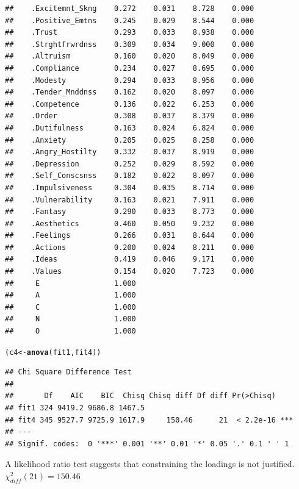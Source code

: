 \documentclass{article}\usepackage[]{graphicx}\usepackage[]{color}
\makeatletter
\newcommand{\hlstd}[1]{\textcolor[rgb]{0.345,0.345,0.345}{#1}}%
\newcommand{\hlkwb}[1]{\textcolor[rgb]{0.69,0.353,0.396}{#1}}%
\newcommand{\hlkwd}[1]{\textcolor[rgb]{0.737,0.353,0.396}{\textbf{#1}}}%
\newenvironment{kframe}{%
 \def\at@end@of@kframe{}%
 \ifinner\ifhmode%
  \def\at@end@of@kframe{\end{minipage}}%
  \begin{minipage}{\columnwidth}%
 \fi\fi%
 \def\FrameCommand##1{\hskip\@totalleftmargin \hskip-\fboxsep
 \colorbox{shadecolor}{##1}\hskip-\fboxsep
     \hskip-\linewidth \hskip-\@totalleftmargin \hskip\columnwidth}%
 \MakeFramed {\advance\hsize-\width
   \@totalleftmargin\z@ \linewidth\hsize
   \@setminipage}}%
 {\par\unskip\endMakeFramed%
 \at@end@of@kframe}
\newenvironment{knitrout}{}{} %
\makeatother
\begin{document}
\begin{knitrout}
\begin{kframe}
\begin{verbatim}
##    .Excitemnt_Skng    0.272    0.031    8.728    0.000
##    .Positive_Emtns    0.245    0.029    8.544    0.000
##    .Trust             0.293    0.033    8.938    0.000
##    .Strghtfrwrdnss    0.309    0.034    9.000    0.000
##    .Altruism          0.160    0.020    8.049    0.000
##    .Compliance        0.234    0.027    8.695    0.000
##    .Modesty           0.294    0.033    8.956    0.000
##    .Tender_Mnddnss    0.162    0.020    8.097    0.000
##    .Competence        0.136    0.022    6.253    0.000
##    .Order             0.308    0.037    8.379    0.000
##    .Dutifulness       0.163    0.024    6.824    0.000
##    .Anxiety           0.205    0.025    8.258    0.000
##    .Angry_Hostilty    0.332    0.037    8.919    0.000
##    .Depression        0.252    0.029    8.592    0.000
##    .Self_Conscsnss    0.182    0.022    8.097    0.000
##    .Impulsiveness     0.304    0.035    8.714    0.000
##    .Vulnerability     0.163    0.021    7.911    0.000
##    .Fantasy           0.290    0.033    8.773    0.000
##    .Aesthetics        0.460    0.050    9.232    0.000
##    .Feelings          0.266    0.031    8.644    0.000
##    .Actions           0.200    0.024    8.211    0.000
##    .Ideas             0.419    0.046    9.171    0.000
##    .Values            0.154    0.020    7.723    0.000
##     E                 1.000                           
##     A                 1.000                           
##     C                 1.000                           
##     N                 1.000                           
##     O                 1.000
\end{verbatim}
\begin{alltt}
\hlstd{(c4} \hlkwb{<-} \hlkwd{anova}\hlstd{(fit1, fit4))}
\end{alltt}
\begin{verbatim}
## Chi Square Difference Test
## 
##       Df    AIC    BIC  Chisq Chisq diff Df diff Pr(>Chisq)    
## fit1 324 9419.2 9686.8 1467.5                                  
## fit4 345 9527.7 9725.9 1617.9     150.46      21  < 2.2e-16 ***
## ---
## Signif. codes:  0 '***' 0.001 '**' 0.01 '*' 0.05 '.' 0.1 ' ' 1
\end{verbatim}
\end{kframe}
\end{knitrout}

A likelihood ratio test suggests that constraining the loadings is not justified. $\chi^2_{diff}(21) = 150.46$
\end{document}
